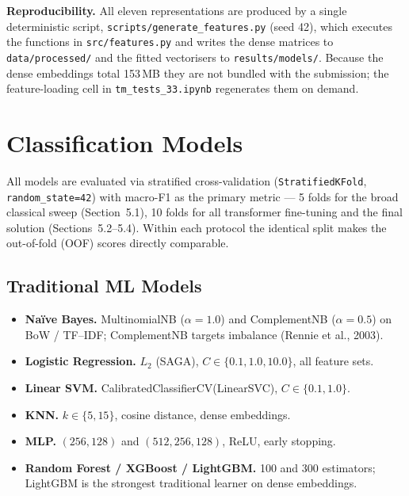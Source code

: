 \documentclass[11pt,a4paper]{article}
\newcommand{\tH}[1]{\textcolor{maincolor}{\textbf{#1}}}
\begin{document}
\textbf{Reproducibility.} All eleven representations are produced by a single deterministic script,
\nolinkurl{scripts/generate_features.py} (seed 42), which executes the functions in
\nolinkurl{src/features.py} and writes the dense matrices to \nolinkurl{data/processed/} and the
fitted vectorisers to \nolinkurl{results/models/}. Because the dense embeddings total 153\,MB they
are not bundled with the submission; the feature-loading cell in \nolinkurl{tm_tests_33.ipynb}
regenerates them on demand.

\section{Classification Models}
All models are evaluated via stratified cross-validation (\texttt{StratifiedKFold},
\texttt{random\_state=42}) with macro-F1 as the primary metric --- 5 folds for the broad classical
sweep (Section~5.1), 10 folds for all transformer fine-tuning and the final solution
(Sections~5.2--5.4). Within each protocol the identical split makes the out-of-fold (OOF) scores
directly comparable.

\subsection{Traditional ML Models}
\begin{itemize}
  \item \tH{Na\"ive Bayes.} MultinomialNB ($\alpha=1.0$) and ComplementNB ($\alpha=0.5$) on
  BoW / TF--IDF; ComplementNB targets imbalance (Rennie et al., 2003).
  \item \tH{Logistic Regression.} $L_2$ (SAGA), $C \in \{0.1, 1.0, 10.0\}$, all feature sets.
  \item \tH{Linear SVM.} CalibratedClassifierCV(LinearSVC), $C \in \{0.1, 1.0\}$.
  \item \tH{KNN.} $k \in \{5, 15\}$, cosine distance, dense embeddings.
  \item \tH{MLP.} $(256,128)$ and $(512,256,128)$, ReLU, early stopping.
  \item \tH{Random Forest / XGBoost / LightGBM.} 100 and 300 estimators; LightGBM is the strongest
  traditional learner on dense embeddings.
\end{itemize}
\end{document}
